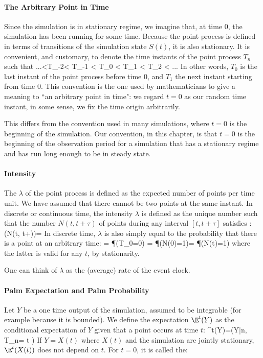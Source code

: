 \paragraph*{The Arbitrary Point in Time}
Since the simulation is in stationary regime, we imagine that, at
time $0$, the simulation has been running for some time. Because the
point process is defined in terms of transitions of the simulation
state $S(t)$, it is also stationary. It is convenient, and
customary, to denote the time instants of the point process $T_n$
such that
  \be...<T_{-2}< T_{-1} < T_{0}  < T_1 < T_2 < ...
  \label{eq-def-arbiti}
  \ee
In other words, $T_0$ is the last instant of the point process
before time $0$, and $T_1$ the next instant starting from time $0$.
This convention is the one used by mathematicians to give a meaning
to ``an arbitrary point in time": we regard $t=0$ as our random time
instant, in some sense, we fix the time origin arbitrarily.

This differs from the convention used in many simulations, where
$t=0$ is the beginning of the simulation. Our convention, in this
chapter, is that $t=0$ is the beginning of the observation period
for a simulation that has a stationary regime and has run long
enough to be in steady state.

\paragraph*{Intensity}
The  $\lambda$ of the point process is defined as the
expected number of points per time unit. We have assumed that there
cannot be two points at the same instant. In discrete or continuous
time, the intensity $\lambda$ is defined as the unique number such
that the number $N(t, t+\tau)$ of points during any interval $[t, t
+ \tau]$ satisfies \cite{baccelli-87}:
 \be
 \E(N(t, t+\tau))= \lambda \tau
 \label{eq-def-intensity}
 \ee
In discrete time, $\lambda$ is also simply equal to the probability
that there is a point at an arbitrary time: \be
 \lambda = \P(T_0=0) = \P(N(0)=1)= \P(N(t)=1)
 \ee where the latter is valid for any $t$, by stationarity.

One can think of $\lambda$ as the (average) rate of the event clock.
\paragraph*{Palm Expectation and Palm Probability}
Let $Y$ be a one time output of the simulation, assumed to be
integrable (for example because it is bounded). We define the
expectation $\E^t(Y)$ as the conditional expectation of $Y$ given
that a point occurs at time $t$:
 \be
 \E^t(Y)=\E(Y|\exists n\in \Ints, T_n= t )
 \ee
If $Y=X(t)$ where $X(t)$ and the simulation are jointly stationary,
$\E^t(X(t))$ does not depend on $t$. For $t=0$, it is called the:


